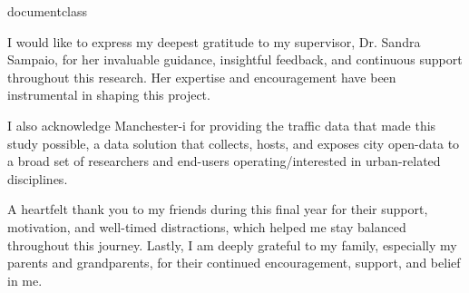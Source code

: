 \csname documentclass
\graphicspath{{\subfix{../images/}}}


I would like to express my deepest gratitude to my supervisor, Dr. Sandra Sampaio, for her invaluable guidance, insightful feedback, and continuous support throughout this research. Her expertise and encouragement have been instrumental in shaping this project.

I also acknowledge Manchester-i for providing the traffic data that made this study possible, a data solution that collects, hosts, and exposes city open-data to a broad set of researchers and end-users operating/interested in urban-related disciplines.

A heartfelt thank you to my friends during this final year for their support, motivation, and well-timed distractions, which helped me stay balanced throughout this journey. Lastly, I am deeply grateful to my family, especially my parents and grandparents, for their continued encouragement, support, and belief in me.

